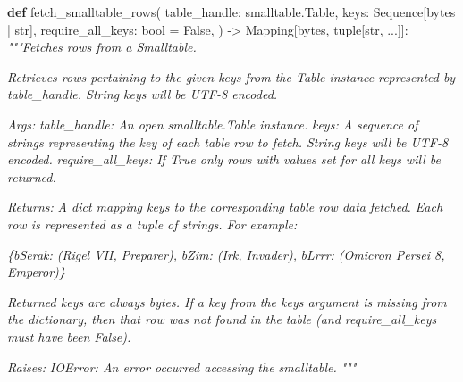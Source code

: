 \documentclass[
]{article}
\newenvironment{Shaded}{}{}
\newcommand{\BuiltInTok}[1]{\textcolor[rgb]{0.00,0.50,0.00}{#1}}
\newcommand{\CommentTok}[1]{\textcolor[rgb]{0.38,0.63,0.69}{\textit{#1}}}
\newcommand{\KeywordTok}[1]{\textcolor[rgb]{0.00,0.44,0.13}{\textbf{#1}}}
\newcommand{\NormalTok}[1]{#1}
\newcommand{\OperatorTok}[1]{\textcolor[rgb]{0.40,0.40,0.40}{#1}}
\newcommand{\VariableTok}[1]{\textcolor[rgb]{0.10,0.09,0.49}{#1}}
\begin{document}
\begin{samepage}
\begin{Shaded}
\begin{Highlighting}[]
\KeywordTok{def}\NormalTok{ fetch\_smalltable\_rows(}
\NormalTok{    table\_handle: smalltable.Table,}
\NormalTok{    keys: Sequence[}\BuiltInTok{bytes} \OperatorTok{|} \BuiltInTok{str}\NormalTok{],}
\NormalTok{    require\_all\_keys: }\BuiltInTok{bool} \OperatorTok{=} \VariableTok{False}\NormalTok{,}
\NormalTok{) }\OperatorTok{{-}\textgreater{}}\NormalTok{ Mapping[}\BuiltInTok{bytes}\NormalTok{, }\BuiltInTok{tuple}\NormalTok{[}\BuiltInTok{str}\NormalTok{, ...]]:}
    \CommentTok{"""Fetches rows from a Smalltable.}

\CommentTok{    Retrieves rows pertaining to the given keys from the Table instance}
\CommentTok{    represented by table\_handle.  String keys will be UTF{-}8 encoded.}

\CommentTok{    Args:}
\CommentTok{        table\_handle: An open smalltable.Table instance.}
\CommentTok{        keys: A sequence of strings representing the key of each table}
\CommentTok{          row to fetch.  String keys will be UTF{-}8 encoded.}
\CommentTok{        require\_all\_keys: If True only rows with values set for all keys will be}
\CommentTok{          returned.}

\CommentTok{    Returns:}
\CommentTok{        A dict mapping keys to the corresponding table row data}
\CommentTok{        fetched. Each row is represented as a tuple of strings. For}
\CommentTok{        example:}

\CommentTok{        \{b\textquotesingle{}Serak\textquotesingle{}: (\textquotesingle{}Rigel VII\textquotesingle{}, \textquotesingle{}Preparer\textquotesingle{}),}
\CommentTok{         b\textquotesingle{}Zim\textquotesingle{}: (\textquotesingle{}Irk\textquotesingle{}, \textquotesingle{}Invader\textquotesingle{}),}
\CommentTok{         b\textquotesingle{}Lrrr\textquotesingle{}: (\textquotesingle{}Omicron Persei 8\textquotesingle{}, \textquotesingle{}Emperor\textquotesingle{})\}}

\CommentTok{        Returned keys are always bytes.  If a key from the keys argument is}
\CommentTok{        missing from the dictionary, then that row was not found in the}
\CommentTok{        table (and require\_all\_keys must have been False).}

\CommentTok{    Raises:}
\CommentTok{        IOError: An error occurred accessing the smalltable.}
\CommentTok{    """}
\end{Highlighting}
\end{Shaded}
\end{samepage}
\end{document}
